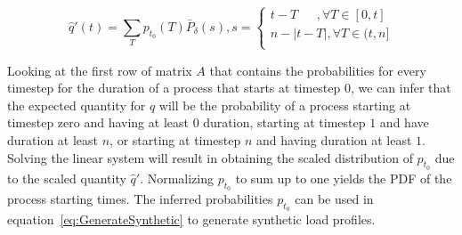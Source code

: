 \documentclass[conference]{IEEEtran}
\begin{document}
\begin{small}
\begin{equation}\label{eq:infer_t_0_axis}
\hat{q}'(t) = \sum_{T} p_{t_0}(T) \bar{P}_{\delta} (s), s =
\left\lbrace
\begin{array}{l}
 t-T~~~~~~~,\forall T \in [0, t]\\
 n-|t-T|,\forall T \in (t, n]\\
\end{array}
\right.
\end{equation}
\end{small}Looking at the first row of matrix $A$ that contains the probabilities for every timestep for the duration of a process that starts at timestep $0$, we can infer that the expected quantity for $q$ will be the probability of a process starting at timestep zero and having at least $0$ duration, starting at timestep $1$ and have duration at least $n$, or starting at timestep $n$ and having duration at least $1$. Solving the linear system will result in obtaining the scaled distribution of $p_{t_0}$ due to the scaled quantity $\hat{q}'$. Normalizing $p_{t_0}$ to sum up to one yields the PDF of the process starting times. The inferred probabilities $p_{t_0}$ can be used in equation~\eqref{eq:GenerateSynthetic} to generate synthetic load profiles. 


%
%
%
 
\end{document}
